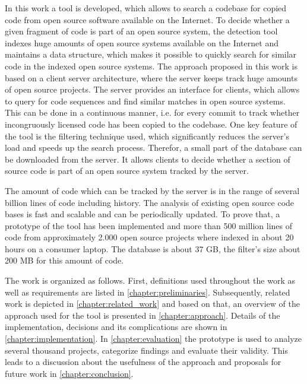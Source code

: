 In this work a tool is developed, which allows to search a codebase for copied code from open source software available on the Internet.
To decide whether a given fragment of code is part of an open source system, the detection tool indexes huge amounts of open source systems available on the Internet and maintains a data structure, which makes it possible to quickly search for similar code in the indexed open source systems.
The approach proposed in this work is based on a client server architecture, where the server keeps track huge amounts of open source projects.
The server provides an interface for clients, which allows to query for code sequences and find similar matches in open source systems.
This can be done in a continuous manner, i.e. for every commit to track whether incongruously licensed code has been copied to the codebase.
One key feature of the tool is the filtering technique used, which significantly reduces the server's load and speeds up the search process.
Therefor, a small part of the database can be downloaded from the server.
It allows clients to decide whether a section of source code is part of an open source system tracked by the server.


The amount of code which can be tracked by the server is in the range of several billion lines of code including history.
The analysis of existing open source code bases is fast and scalable and can be periodically updated.
To prove that, a prototype of the tool has been implemented and more than 500 million lines of code from approximately 2.000 open source projects where indexed in about 20 hours on a consumer laptop.
The database is about 37 GB, the filter's size about 200 MB for this amount of code.


The work is organized as follows.
First, definitions used throughout the work as well as requirements are listed in \autoref{chapter:preliminaries}.
Subsequently, related work is depicted in \autoref{chapter:related_work} and based on that, an overview of the approach used for the tool is presented in \autoref{chapter:approach}.
Details of the implementation, decisions and its complications are shown in \autoref{chapter:implementation}.
In \autoref{chapter:evaluation} the prototype is used to analyze several thousand projects, categorize findings and evaluate their validity.
This leads to a discussion about the usefulness of the approach and proposals for future work in \autoref{chapter:conclusion}.